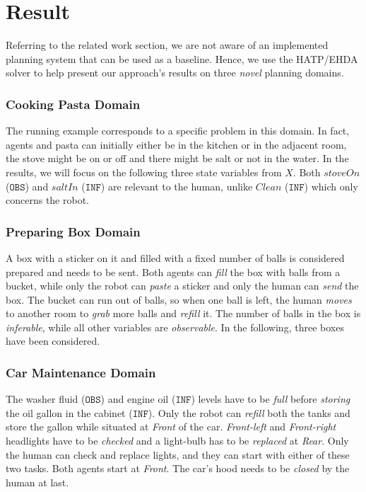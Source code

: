 {%
\section{Result}

Referring to the related work section, we are not aware of an implemented planning system that can be used as a baseline. Hence, we use the HATP/EHDA solver to help present our approach's results on three \textit{novel} planning domains.

\subsubsection{Cooking Pasta Domain}
The running example corresponds to a specific problem in this domain. In fact, agents and pasta can initially either be in the kitchen or in the adjacent room, the stove might be on or off and there might be salt or not in the water.  
In the results, we will focus on the following three state variables from $X$. Both $stoveOn$ ($\texttt{OBS}$) and $saltIn$ ($\texttt{INF}$) are relevant to the human, unlike $Clean$ ($\texttt{INF}$) which only concerns the robot. 

\subsubsection{Preparing Box Domain}
A box with a sticker on it and filled with a fixed number of balls is considered prepared and needs to be sent. Both agents can \textit{fill} the box with balls from a bucket, while only the robot can \textit{paste} a sticker and only the human can \textit{send} the box. The bucket can run out of balls, so when one ball is left, the human \textit{moves} to another room to \textit{grab} more balls and \textit{refill} it. 
The number of balls in the box is \textit{inferable}, while all other variables are {\em observable}. 
In the following, three boxes have been considered.

\subsubsection{Car Maintenance Domain}
The washer fluid ($\texttt{OBS}$) and engine oil ($\texttt{INF}$) levels have to be \textit{full} before \textit{storing} the oil gallon in the cabinet ($\texttt{INF}$). 
Only the robot can \textit{refill} both the tanks and store the gallon while situated at \textit{Front} of the car. 
\textit{Front-left} and \textit{Front-right} headlights have to be \textit{checked} and a light-bulb has to be \textit{replaced} at \textit{Rear}. 
Only the human can check and replace lights, and they can start with either of these two tasks.
Both agents start at \textit{Front}.
The car's hood needs to be \textit{closed} by the human at last.

}
